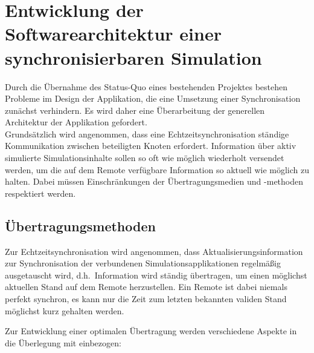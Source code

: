 \documentclass[11pt,twoside,a4paper]{article}
\begin{document}
\section{Entwicklung der Softwarearchitektur einer synchronisierbaren Simulation}
Durch die Übernahme des Status-Quo eines bestehenden Projektes bestehen Probleme im Design der Applikation, die eine Umsetzung einer Synchronisation zunächst verhindern. Es wird daher eine Überarbeitung der generellen Architektur der Applikation gefordert.\\
Grundsätzlich wird angenommen, dass eine Echtzeitsynchronisation ständige Kommunikation zwischen beteiligten Knoten erfordert.
Information über aktiv simulierte Simulationsinhalte sollen so oft wie möglich wiederholt versendet werden, um die auf dem Remote verfügbare Information so aktuell wie möglich zu halten. Dabei müssen Einschränkungen der Übertragungsmedien und -methoden respektiert werden.\\




\subsection{Übertragungsmethoden}
Zur Echtzeitsynchronisation wird angenommen, dass Aktualisierungsinformation zur Synchronisation der verbundenen Simulationsapplikationen regelmäßig ausgetauscht wird, d.h.~Information wird ständig übertragen, um einen möglichst aktuellen Stand auf dem Remote herzustellen. Ein Remote ist dabei niemals perfekt synchron, es kann nur die Zeit zum letzten bekannten validen Stand möglichst kurz gehalten werden.

Zur Entwicklung einer optimalen Übertragung werden verschiedene Aspekte in die Überlegung mit einbezogen:
\end{document}
